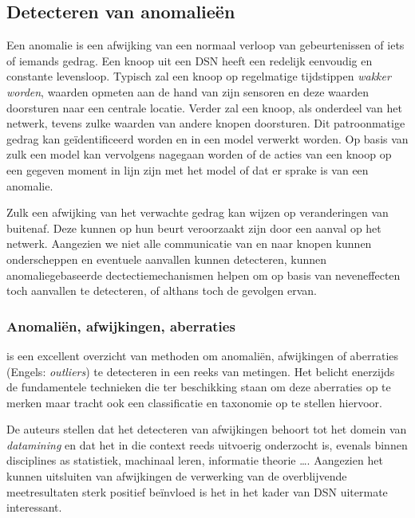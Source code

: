 
\subsection{Detecteren van anomalie\"en}
\label{subsection:anomaly}

Een anomalie is een afwijking van een normaal verloop van gebeurtenissen of
iets of iemands gedrag. Een knoop uit een DSN heeft een redelijk eenvoudig en
constante levensloop. Typisch zal een knoop op regelmatige tijdstippen
\emph{wakker worden}, waarden opmeten aan de hand van zijn sensoren en deze
waarden doorsturen naar een centrale locatie. Verder zal een knoop, als
onderdeel van het netwerk, tevens zulke waarden van andere knopen doorsturen.
Dit patroonmatige gedrag kan ge\"identificeerd worden en in een model verwerkt
worden. Op basis van zulk een model kan vervolgens nagegaan worden of de acties
van een knoop op een gegeven moment in lijn zijn met het model of dat er sprake
is van een anomalie.

Zulk een afwijking van het verwachte gedrag kan wijzen op veranderingen van
buitenaf. Deze kunnen op hun beurt veroorzaakt zijn door een aanval op het
netwerk. Aangezien we niet alle communicatie van en naar knopen kunnen
onderscheppen en eventuele aanvallen kunnen detecteren, kunnen
anomaliegebaseerde dectectiemechanismen helpen om op basis van neveneffecten
toch aanvallen te detecteren, of althans toch de gevolgen ervan.

\subsubsection*{Anomali\"en, afwijkingen, aberraties}
\label{subsubsection:outlier}

\citep{zhang2010outlier} is een excellent overzicht van methoden om anomali\"en,
afwijkingen of aberraties (Engels: \emph{outliers}) te detecteren in een reeks
van metingen. Het belicht enerzijds de fundamentele technieken die ter
beschikking staan om deze aberraties op te merken maar tracht ook een
classificatie en taxonomie op te stellen hiervoor.

De auteurs stellen dat het detecteren van afwijkingen behoort tot het domein
van \emph{datamining} en dat het in die context reeds uitvoerig onderzocht is,
evenals binnen disciplines as statistiek, machinaal leren, informatie
theorie \dots. Aangezien het kunnen uitsluiten van afwijkingen de verwerking
van de overblijvende meetresultaten sterk positief be\"invloed is het in het
kader van DSN uitermate interessant.

